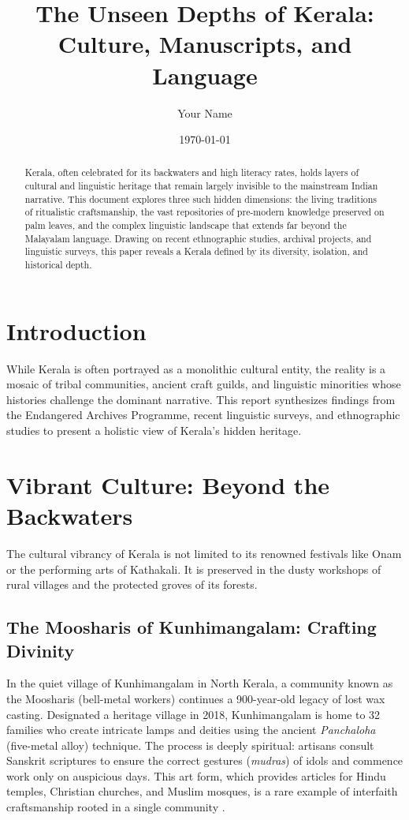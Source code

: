 \documentclass[12pt]{article}
\title{The Unseen Depths of Kerala: Culture, Manuscripts, and Language}
\author{Your Name}
\date{\today}
\begin{document}
\maketitle

\begin{abstract}
Kerala, often celebrated for its backwaters and high literacy rates, holds layers of cultural and linguistic heritage that remain largely invisible to the mainstream Indian narrative. This document explores three such hidden dimensions: the living traditions of ritualistic craftsmanship, the vast repositories of pre-modern knowledge preserved on palm leaves, and the complex linguistic landscape that extends far beyond the Malayalam language. Drawing on recent ethnographic studies, archival projects, and linguistic surveys, this paper reveals a Kerala defined by its diversity, isolation, and historical depth.
\end{abstract}

\section*{Introduction}
While Kerala is often portrayed as a monolithic cultural entity, the reality is a mosaic of tribal communities, ancient craft guilds, and linguistic minorities whose histories challenge the dominant narrative. This report synthesizes findings from the Endangered Archives Programme, recent linguistic surveys, and ethnographic studies to present a holistic view of Kerala's hidden heritage.

\section{Vibrant Culture: Beyond the Backwaters}
The cultural vibrancy of Kerala is not limited to its renowned festivals like Onam or the performing arts of Kathakali. It is preserved in the dusty workshops of rural villages and the protected groves of its forests.

\subsection{The Moosharis of Kunhimangalam: Crafting Divinity}
In the quiet village of Kunhimangalam in North Kerala, a community known as the Moosharis (bell-metal workers) continues a 900-year-old legacy of lost wax casting. Designated a heritage village in 2018, Kunhimangalam is home to 32 families who create intricate lamps and deities using the ancient \textit{Panchaloha} (five-metal alloy) technique. The process is deeply spiritual: artisans consult Sanskrit scriptures to ensure the correct gestures (\textit{mudras}) of idols and commence work only on auspicious days. This art form, which provides articles for Hindu temples, Christian churches, and Muslim mosques, is a rare example of interfaith craftsmanship rooted in a single community \cite{moosharis}.
\end{document}
